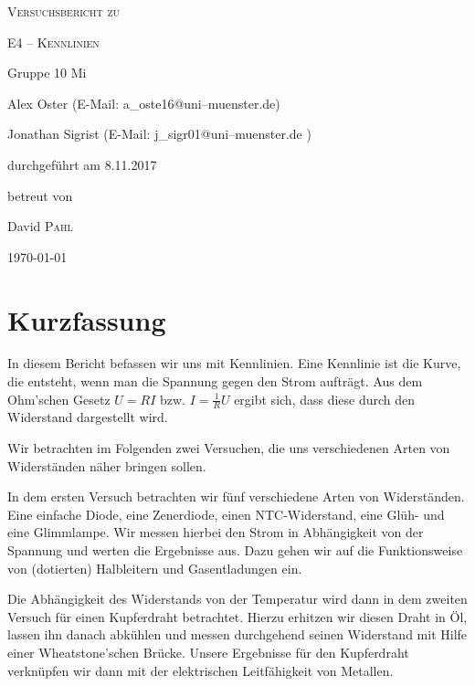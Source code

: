 \documentclass[11pt,a4paper,titlepage, ngerman]{article}
\begin{document}
	
	\begin{titlepage}
		\centering
		{\scshape\LARGE Versuchsbericht zu \par}
		\vspace{1cm}
		{\scshape\huge E4 -- Kennlinien\par}
		\vspace{2.5cm}
		{\LARGE Gruppe 10 Mi\par}
		\vspace{0.5cm}
		{\large Alex Oster (E-Mail: a\_oste16@uni--muenster.de) \par}
		{\large Jonathan Sigrist (E-Mail: j\_sigr01@uni--muenster.de ) \par}
		\vfill
		durchgeführt am 8.11.2017\par
		betreut von\par
		{\large David \textsc{Pahl}}
		
		\vfill
		
		{\large \today\par}
	\end{titlepage}
		
	\tableofcontents
	
	\newpage
	
	\section{Kurzfassung}
		
		In diesem Bericht befassen wir uns mit Kennlinien. Eine Kennlinie ist die Kurve, die entsteht, wenn man die Spannung gegen den Strom aufträgt. Aus dem Ohm'schen Gesetz $U=RI$ bzw. $I = \frac{1}{R}U $ ergibt sich, dass diese durch den Widerstand dargestellt wird. 
		
		Wir betrachten im Folgenden zwei Versuchen, die uns verschiedenen Arten von Widerständen näher bringen sollen. 
		
		In dem ersten Versuch betrachten wir fünf verschiedene Arten von Widerständen. Eine einfache Diode, eine Zenerdiode, einen NTC-Widerstand, eine Glüh- und eine Glimmlampe. Wir messen hierbei den Strom in Abhängigkeit von der Spannung und werten die Ergebnisse aus. Dazu gehen wir auf die Funktionsweise von (dotierten) Halbleitern und Gasentladungen ein. 
		
		Die Abhängigkeit des Widerstands von der Temperatur wird dann in dem zweiten Versuch für einen Kupferdraht betrachtet.
		Hierzu erhitzen wir diesen Draht in Öl, lassen ihn danach abkühlen und messen durchgehend seinen Widerstand mit Hilfe einer Wheatstone'schen Brücke. Unsere Ergebnisse für den Kupferdraht verknüpfen wir dann mit der elektrischen Leitfähigkeit von Metallen.
\end{document}
